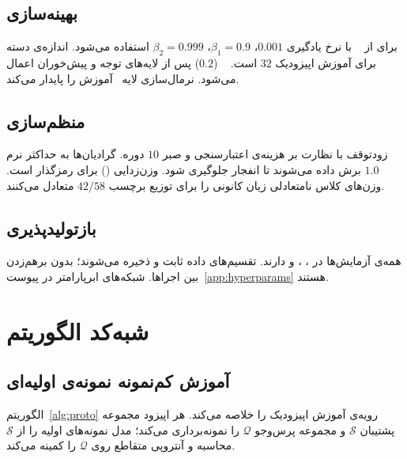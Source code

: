 \subsection{بهینه‌سازی}

برای  از ~\cite{kingma2014adam} با نرخ یادگیری $0.001$، $\beta_1=0.9$، $\beta_2=0.999$ استفاده می‌شود. اندازه‌ی دسته برای آموزش اپیزودیک $32$ است. ~\cite{srivastava2014dropout} ($0.2$) پس از لایه‌های توجه و پیش‌خوران اعمال می‌شود. نرمال‌سازی لایه~\cite{ba2016layer} آموزش را پایدار می‌کند.

\subsection{منظم‌سازی}

زودتوقف با نظارت بر هزینه‌ی اعتبارسنجی و صبر $10$ دوره. گرادیان‌ها به حداکثر نرم $1.0$ برش داده می‌شوند تا انفجار جلوگیری شود. وزن‌زدایی () برای رمزگذار  است. وزن‌های کلاس نامتعادلی زیان کانونی را برای توزیع برچسب $42/58$ متعادل می‌کنند.

\subsection{بازتولیدپذیری}

همه‌ی آزمایش‌ها \texttt{} در ، ، و  دارند. تقسیم‌های داده ثابت و ذخیره می‌شوند؛ بدون برهم‌زدن بین اجراها. شبکه‌های ابرپارامتر در پیوست~\ref{app:hyperparams} هستند.

\section{شبه‌کد الگوریتم}

\subsection{آموزش کم‌نمونه نمونه‌ی اولیه‌ای}

الگوریتم~\ref{alg:proto} رویه‌ی آموزش اپیزودیک را خلاصه می‌کند. هر اپیزود مجموعه پشتیبان $\mathcal{S}$ و مجموعه پرس‌وجو $\mathcal{Q}$ را نمونه‌برداری می‌کند؛ مدل نمونه‌های اولیه را از $\mathcal{S}$ محاسبه و آنتروپی متقاطع روی $\mathcal{Q}$ را کمینه می‌کند.

